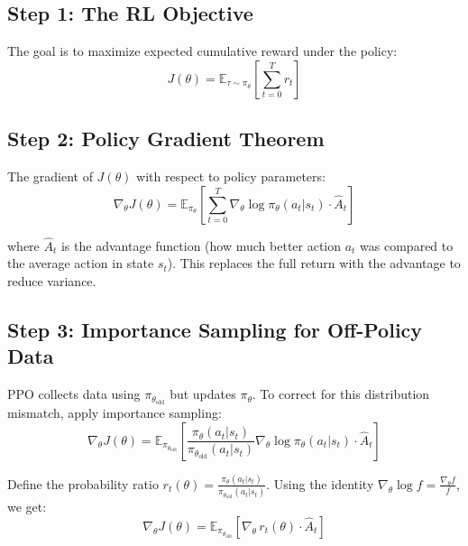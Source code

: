 \subsection{Step 1: The RL Objective}
\label{step-1-the-rl-objective}

The goal is to maximize expected cumulative reward under the policy: 
\begin{equation}
J(\theta) = \mathbb{E}_{\tau \sim \pi_\theta}\left[\sum_{t=0}^T r_t\right]
\end{equation}

\subsection{Step 2: Policy Gradient Theorem}
\label{step-2-policy-gradient-theorem}

The gradient of $J(\theta)$ with respect to policy parameters: 
\begin{equation}
\boxed{\nabla_\theta J(\theta) = \mathbb{E}_{\pi_\theta}\left[\sum_{t=0}^T \nabla_\theta \log \pi_\theta(a_t|s_t) \cdot \hat{A}_t\right]}
\end{equation}

where $\hat{A}_t$ is the advantage function (how much better action $a_t$ was compared to the average action in state $s_t$). This replaces the full return with the advantage to reduce variance.

\subsection{Step 3: Importance Sampling for Off-Policy Data}
\label{step-3-importance-sampling-for-off-policy-data}

PPO collects data using $\pi_{\theta_{\text{old}}}$ but updates $\pi_\theta$. To correct for this distribution mismatch, apply importance sampling: 
\begin{equation}
\nabla_\theta J(\theta) = \mathbb{E}_{\pi_{\theta_{\text{old}}}}\left[\frac{\pi_\theta(a_t|s_t)}{\pi_{\theta_{\text{old}}}(a_t|s_t)} \nabla_\theta \log \pi_\theta(a_t|s_t) \cdot \hat{A}_t\right]
\end{equation}

Define the probability ratio $r_t(\theta) = \frac{\pi_\theta(a_t|s_t)}{\pi_{\theta_{\text{old}}}(a_t|s_t)}$. Using the identity $\nabla_\theta \log f = \frac{\nabla_\theta f}{f}$, we get: 
\begin{equation}
\nabla_\theta J(\theta) = \mathbb{E}_{\pi_{\theta_{\text{old}}}}\left[\nabla_\theta\, r_t(\theta) \cdot \hat{A}_t\right]
\end{equation}

